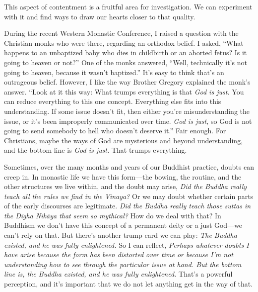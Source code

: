 This aspect of contentment is a fruitful area for investigation. We can 
experiment with it and find ways to draw our hearts closer to that 
quality.


During the recent Western Monastic Conference, I raised a question with 
the Christian monks who were there, regarding an orthodox belief. I 
asked, ``What happens to an unbaptized baby who dies in childbirth or 
an aborted fetus? Is it going to heaven or not?'' One of the monks 
answered, ``Well, technically it's not going to heaven, because it 
wasn't baptized.'' It's easy to think that's an outrageous belief. 
However, I like the way Brother Gregory explained the monk's answer. 
``Look at it this way: What trumps everything is that \emph{God is 
just.} You can reduce everything to this one concept. Everything else 
fits into this understanding. If some issue doesn't fit, then either 
you're misunderstanding the issue, or it's been improperly communicated 
over time. \emph{God is just,} so God is not going to send somebody to 
hell who doesn't deserve it.'' Fair enough. For Christians, maybe the 
ways of God are mysterious and beyond understanding, and the bottom 
line is \emph{God is just.} That trumps everything.

Sometimes, over the many months and years of our Buddhist practice, 
doubts can creep in. In monastic life we have this form---the bowing, 
the routine, and the other structures we live within, and the doubt may 
arise, \emph{Did the Buddha really teach all the rules we find in the 
Vinaya?} Or we may doubt whether certain parts of the early discourses 
are legitimate. \emph{Did the Buddha really teach those suttas in the 
Dīgha Nikāya that seem so mythical?} How do we deal with that? In 
Buddhism we don't have this concept of a permanent deity or a just 
God---we can't rely on that. But there's another trump card we can 
play: \emph{The Buddha existed, and he was fully enlightened.} So I can 
reflect, \emph{Perhaps whatever doubts I have arise because the form 
has been distorted over time or because I'm not understanding how to 
see through the particular issue at hand. But the bottom line is, the 
Buddha existed, and he was fully enlightened.} That's a powerful 
perception, and it's important that we do not let anything get in the 
way of that.

